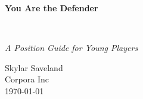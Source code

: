
\clearpage
\vspace*{1.5in}
\begin{center}
  \begin{minipage}{\textwidth}
    \centering
    \Huge\bfseries
    \linespread{1.25}\selectfont
  You Are the Defender
  \end{minipage}
  \\[3em]
  {\Large\itshape\linespread{1.3}\selectfont
  A Position Guide for Young Players\par}
  \vfill
  {\large Skylar Saveland}
  \\[1em]
  {\large Corpora Inc}
  \\[1em]
  {\large \today}
\end{center}
\clearpage
